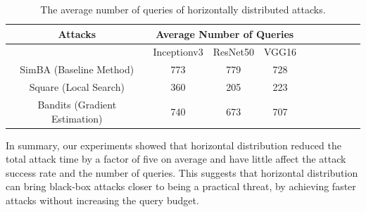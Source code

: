\begin{table}[bth]
\begin{center}
\begin{tabular}{cccccccccc}
\hline
Attacks & \multicolumn{3}{c}{Average Number of Queries}\\ \hline
        & Inceptionv3           & ResNet50             & VGG16         \\
SimBA (Baseline Method)   &  773  & 779    & 728  \\
Square (Local Search)  & 360   & 205    & 223  \\
Bandits (Gradient Estimation) & 740   & 673  & 707  \\ \hline
\end{tabular}
\end{center}
\caption{The average number of queries of horizontally distributed attacks.}
\label{tab:horizon}
\end{table}

In summary, our experiments showed that horizontal distribution reduced the total attack time by a factor of five on average and have little affect the attack success rate and the number of queries. This suggests that horizontal distribution can bring black-box attacks closer to being a practical threat, by achieving faster attacks without increasing the query budget.


